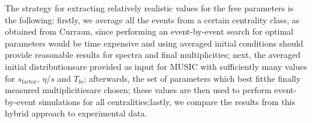 \newpage


The strategy for extracting relatively realistic values for the free parameters is the following: firstly, we average all the events from a certain centrality class, as obtained from {\sffamily Curraun}, since performing an event-by-event search for optimal parameters would be time expensive and using averaged initial conditions should provide reasonable results for spectra and final multiplicities; next, the averaged initial distributionsare provided as input for {\sffamily MUSIC} with sufficiently many values for $s_\text{factor}$, $\eta/s$ and $T_\text{fo}$; afterwards, the set of parameters which best fitthe finally measured multiplicitiesare chosen; these values are then used to perform event-by-event simulations for all centralities;lastly, we compare the results from this hybrid approach to experimental data. \\
